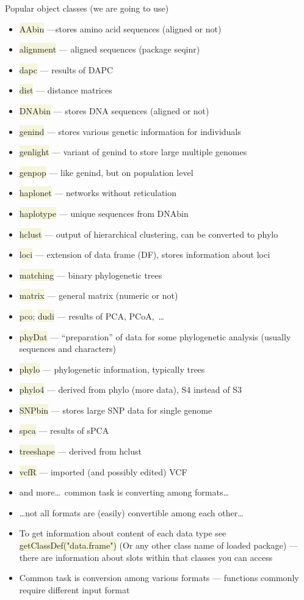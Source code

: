\documentclass[compress, ucs, xelatex, 11pt, xcolor=svgnames, aspectratio=169,
	hyperref={
		bookmarks=true,
		unicode=true,
		colorlinks=true,
		pdftitle={Molecular data in R},
		plainpages=false,
		pdfauthor={Vojtech Zeisek},
		pdfsubject={Course about phylogeny and evolution in R},
		pdfcreator={XeLaTeX},
		pdfkeywords={R, evolution, phylogeny, molecular data},
		linkcolor=Crimson, %
		anchorcolor=Magenta, %
		citecolor=Magenta, %
		filecolor=Magenta, %
		menucolor=Magenta, %
		urlcolor=DodgerBlue, %
		pdftex},
	url={hyphens, lowtilde} %
	]{beamer}
\renewcommand{\texttt}[1]{\colorbox{Beige}{{\ttfamily #1}}}
\begin{document}
\begin{frame}[allowframebreaks]{Popular object classes (we are going to use)}
	\begin{itemize}
		\item \texttt{AAbin} ---stores amino acid sequences (aligned or not)
		\item \texttt{alignment} --- aligned sequences (package seqinr)
		\item \texttt{dapc} --- results of DAPC
		\item \texttt{dist} --- distance matrices
		\item \texttt{DNAbin} --- stores DNA sequences (aligned or not)
		\item \texttt{genind} --- stores various genetic information for individuals
		\item \texttt{genlight} --- variant of genind to store large multiple genomes
		\item \texttt{genpop} --- like genind, but on population level
		\item \texttt{haplonet} --- networks without reticulation
		\item \texttt{haplotype} --- unique sequences from DNAbin
		\item \texttt{hclust} --- output of hierarchical clustering, can be converted to phylo
		\item \texttt{loci} --- extension of data frame (DF), stores information about loci
		\item \texttt{matching} --- binary phylogenetic trees
		\item \texttt{matrix} --- general matrix (numeric or not)
		\item \texttt{pco}; \texttt{dudi} --- results of PCA, PCoA,~\ldots
		\item \texttt{phyDat} --- \enquote{preparation} of data for some phylogenetic analysis (usually sequences and characters)
		\item \texttt{phylo} --- phylogenetic information, typically trees
		\item \texttt{phylo4} --- derived from phylo (more data), S4 instead of S3
		\item \texttt{SNPbin} --- stores large SNP data for single genome
		\item \texttt{spca} --- results of sPCA
		\item \texttt{treeshape} --- derived from hclust
		\item \texttt{vcfR} --- imported (and possibly edited) VCF
		\item and more\ldots~common task is converting among formats\ldots
		\item \ldots not all formats are (easily) convertible among each other\ldots
		\item To get information about content of each data type see \texttt{getClassDef("data.frame")} (Or any other class name of loaded package) --- there are information about slots within that classes you can access
		\item Common task is conversion among various formats --- functions commonly require different input format
	\end{itemize}
\end{frame}
\end{document}
